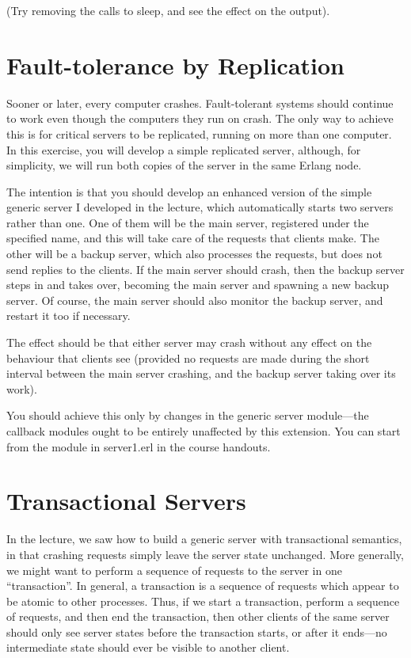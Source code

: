 \documentclass{article}
\begin{document}
(Try removing the calls to sleep, and see the effect on the output).

\section{Fault-tolerance by Replication}

Sooner or later, every computer crashes. Fault-tolerant systems should
continue to work even though the computers they run on crash. The only
way to achieve this is for critical servers to be replicated, running
on more than one computer. In this exercise, you will develop a simple
replicated server, although, for simplicity, we will run both copies
of the server in the same Erlang node.

The intention is that you should develop an enhanced version of the
simple generic server I developed in the lecture, which automatically
starts two servers rather than one. One of them will be the main
server, registered under the specified name, and this will take care
of the requests that clients make. The other will be a backup server,
which also processes the requests, but does not send replies to the
clients. If the main server should crash, then the backup server steps
in and takes over, becoming the main server and spawning a new backup
server. Of course, the main server should also monitor the backup
server, and restart it too if necessary.

The effect should be that either server may crash without any effect
on the behaviour that clients see (provided no requests are made
during the short interval between the main server crashing, and the
backup server taking over its work).

You should achieve this only by changes in the generic server
module—the callback modules ought to be entirely unaffected by this
extension. You can start from the module in \textsf{server1.erl} in
the course handouts.

\section{Transactional Servers}

In the lecture, we saw how to build a generic server with
transactional semantics, in that crashing requests simply leave the
server state unchanged. More generally, we might want to perform a
sequence of requests to the server in one “transaction”. In general, a
transaction is a sequence of requests which appear to be atomic to
other processes. Thus, if we start a transaction, perform a sequence
of requests, and then end the transaction, then other clients of the
same server should only see server states before the transaction
starts, or after it ends—no intermediate state should ever be visible
to another client.
\end{document}

